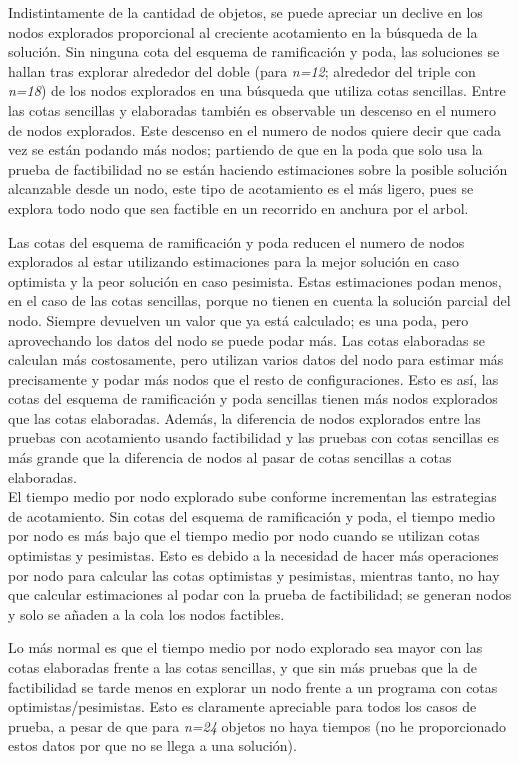 \documentclass[12pt , a4paper]{article}
\begin{document}
Indistintamente de la cantidad de objetos, se puede apreciar un declive en los nodos explorados proporcional al creciente acotamiento en la búsqueda de la solución. Sin ninguna cota del esquema de ramificación y poda, las soluciones se hallan tras explorar alrededor del doble (para \textit{n=12}; alrededor del triple con \textit{n=18}) de los nodos explorados en una búsqueda que utiliza cotas sencillas. Entre las cotas sencillas y elaboradas también es observable un descenso en el numero de nodos explorados. Este descenso en el numero de nodos quiere decir que cada vez se están podando más nodos; partiendo de que en la poda que solo usa la prueba de factibilidad no se están haciendo estimaciones sobre la posible solución alcanzable desde un nodo, este tipo de acotamiento es el más ligero, pues se explora todo nodo que sea factible en un recorrido en anchura por el arbol. 

Las cotas del esquema de ramificación y poda reducen el numero de nodos explorados al estar utilizando estimaciones para la mejor solución en caso optimista y la peor solución en caso pesimista. Estas estimaciones podan menos, en el caso de las cotas sencillas, porque no tienen en cuenta la solución parcial del nodo. Siempre devuelven un valor que ya está calculado; es una poda, pero aprovechando los datos del nodo se puede podar más. Las cotas elaboradas se calculan más costosamente, pero utilizan varios datos del nodo para estimar más precisamente y podar más nodos que el resto de configuraciones. Esto es así, las cotas del esquema de ramificación y poda sencillas tienen más nodos explorados que las cotas elaboradas. Además, la diferencia de nodos explorados entre las pruebas con acotamiento usando factibilidad y las pruebas con cotas sencillas es más grande que la diferencia de nodos al pasar de cotas sencillas a cotas elaboradas.
\\

El tiempo medio por nodo explorado sube conforme incrementan las estrategias de acotamiento. Sin cotas del esquema de ramificación y poda, el tiempo medio por nodo es más bajo que el tiempo medio por nodo cuando se utilizan cotas optimistas y pesimistas. Esto es debido a la necesidad de hacer más operaciones por nodo para calcular las cotas optimistas y pesimistas, mientras tanto, no hay que calcular estimaciones al podar con la prueba de factibilidad; se generan nodos y solo se añaden a la cola los nodos factibles. 

Lo más normal es que el tiempo medio por nodo explorado sea mayor con las cotas elaboradas frente a las cotas sencillas, y que sin más pruebas que la de factibilidad se tarde menos en explorar un nodo frente a un programa con cotas optimistas/pesimistas. Esto es claramente apreciable para todos los casos de prueba, a pesar de que para \textit{n=24} objetos no haya tiempos (no he proporcionado estos datos por que no se llega a una solución).
\\
\end{document}
